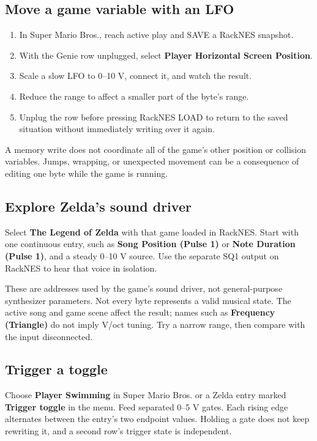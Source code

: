 \subsection{Move a game variable with an LFO}
\begin{enumerate}
\item In Super Mario Bros., reach active play and SAVE a RackNES snapshot.
\item With the Genie row unplugged, select
\textbf{Player Horizontal Screen Position}.
\item Scale a slow LFO to 0--10 V, connect it, and watch the result.
\item Reduce the range to affect a smaller part of the byte's range.
\item Unplug the row before pressing RackNES LOAD to return to the saved
situation without immediately writing over it again.
\end{enumerate}
A memory write does not coordinate all of the game's other position or
collision variables. Jumps, wrapping, or unexpected movement can be a
consequence of editing one byte while the game is running.

\subsection{Explore Zelda's sound driver}
Select \textbf{The Legend of Zelda} with that game loaded in RackNES.
Start with one continuous entry, such as \textbf{Song Position (Pulse 1)}
or \textbf{Note Duration (Pulse 1)}, and a steady 0--10 V source. Use the
separate SQ1 output on RackNES to hear that voice in isolation.

These are addresses used by the game's sound driver, not general-purpose
synthesizer parameters. Not every byte represents a valid musical state.
The active song and game scene affect the result; names such as
\textbf{Frequency (Triangle)} do not imply V/oct tuning. Try a narrow range,
then compare with the input disconnected.

\subsection{Trigger a toggle}
Choose \textbf{Player Swimming} in Super Mario Bros. or a Zelda entry marked
\textbf{Trigger toggle} in the menu. Feed separated 0--5 V gates. Each rising
edge alternates between the entry's two endpoint values. Holding a gate does
not keep rewriting it,
and a second row's trigger state is independent.

